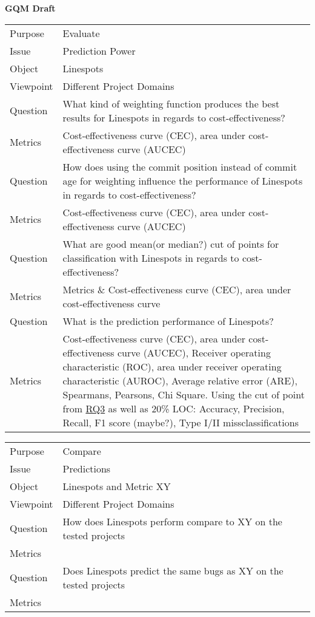 \textbf{GQM Draft}

\begin{center}
\begin{tabularx}{\linewidth}{| l | X |}
 \hline
 Purpose & Evaluate \\ 
 Issue & Prediction Power \\  
 Object & Linespots \\
 Viewpoint & Different Project Domains\\
 \hline \hline 
 Question & What kind of weighting function produces the best results for Linespots in regards to cost-effectiveness?  \\
 \hline
 Metrics & Cost-effectiveness curve (CEC), area under cost-effectiveness curve (AUCEC)   \\
 \hline \hline
 Question &  How does using the commit position instead of commit age for weighting influence the performance of Linespots in regards to cost-effectiveness?  \\
 \hline
 Metrics & Cost-effectiveness curve (CEC), area under cost-effectiveness curve (AUCEC)    \\
 \hline \hline
 Question & What are good mean(or median?) cut of points for classification with Linespots in regards to cost-effectiveness?  \\
 \hline
 Metrics & Metrics \& Cost-effectiveness curve (CEC), area under cost-effectiveness curve   \\
 \hline \hline
 Question & What is the prediction performance of Linespots? \\
 \hline
 Metrics & Cost-effectiveness curve (CEC), area under cost-effectiveness curve (AUCEC), Receiver operating characteristic (ROC), area under receiver operating characteristic (AUROC), Average relative error (ARE), Spearmans, Pearsons, Chi Square. Using the cut of point from \hyperref[sec:rq3]{RQ3} as well as 20\% LOC: Accuracy, Precision, Recall, F1 score (maybe?), Type I/II missclassifications \\
\hline
\end{tabularx}


\begin{tabularx}{\linewidth}{| l | X |}
 \hline
 Purpose & Compare \\ 
 Issue & Predictions \\
 Object & Linespots and Metric XY \\
 Viewpoint & Different Project Domains\\
 \hline \hline 
 Question & How does Linespots perform compare to XY on the tested projects \\
 \hline
 Metrics &    \\
 \hline \hline
 Question & Does Linespots predict the same bugs as  XY on the tested projects \\
 \hline
 Metrics &    \\
 \hline \hline
\end{tabularx}


\end{center}
